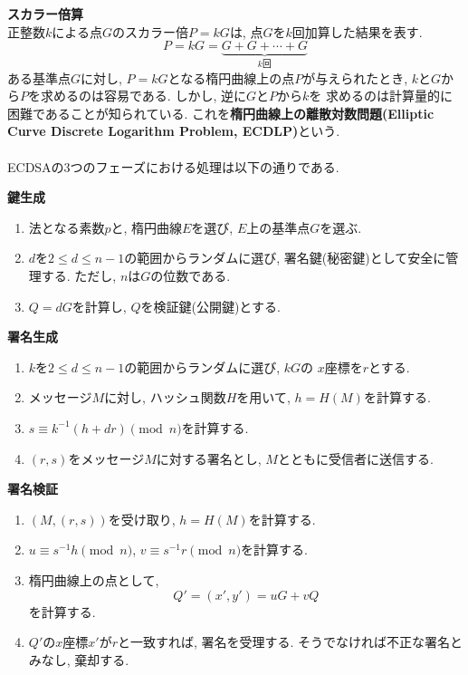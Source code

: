 \vspace{0.5em}
\noindent\textbf{スカラー倍算}\\
\indent 正整数$k$による点$G$のスカラー倍$P=kG$は, 点$G$を$k$回加算した結果を表す.
\[
  P=kG=\underbrace{G+G+\cdots+G}_{k\text{回}}
\]
\indent ある基準点$G$に対し, $P = kG$となる楕円曲線上の点$P$が与えられたとき, 
$k$と$G$から$P$を求めるのは容易である. しかし, 逆に$G$と$P$から$k$を
求めるのは計算量的に困難であることが知られている. 
これを\textbf{楕円曲線上の離散対数問題(Elliptic Curve Discrete Logarithm Problem, ECDLP)}という.\\[1em]

\\
\indent ECDSAの3つのフェーズにおける処理は以下の通りである.
\vspace{1em}
\let\ltxlist\list
\begin{breakitembox}[l]{\textbf{鍵生成}}
  　
  \begin{enumerate}[parsep=7pt]
    \item 法となる素数$p$と, 楕円曲線$E$を選び, $E$上の基準点$G$を選ぶ.
    \item $d$を$2\leq d\leq n-1$の範囲からランダムに選び, 
    署名鍵(秘密鍵)として安全に管理する. ただし, $n$は$G$の位数である.
    \item $Q=dG$を計算し, $Q$を検証鍵(公開鍵)とする.
  \end{enumerate}
\end{breakitembox}
\vspace{1em}
\let\ltxlist\list
\begin{breakitembox}[l]{\textbf{署名生成}}
  　
  \begin{enumerate}[parsep=7pt]
    \item $k$を$2\leq d\leq n-1$の範囲からランダムに選び, $kG$の
    $x$座標を$r$とする.
    \item メッセージ$M$に対し, ハッシュ関数$H$を用いて, $h=H(M)$を計算する.
    \item $s\equiv k^{-1}(h+dr)\pmod n$を計算する.
    \item $(r,s)$をメッセージ$M$に対する署名とし, 
    $M$とともに受信者に送信する.
  \end{enumerate}
\end{breakitembox}
\vspace{1em}
\let\ltxlist\list
\begin{breakitembox}[l]{\textbf{署名検証}}
  　
  \begin{enumerate}[parsep=7pt]
    \item $(M,(r,s))$を受け取り, $h=H(M)$を計算する. 
    \item $u\equiv s^{-1}h\pmod n$, $v\equiv s^{-1}r\pmod n$を計算する.
    \item 楕円曲線上の点として, 
    \[
      Q'=(x',y')=uG+vQ
    \]
    を計算する.
    \item $Q'$の$x$座標$x'$が$r$と一致すれば, 署名を受理する.
    そうでなければ不正な署名とみなし, 棄却する.
  \end{enumerate}
\end{breakitembox}
